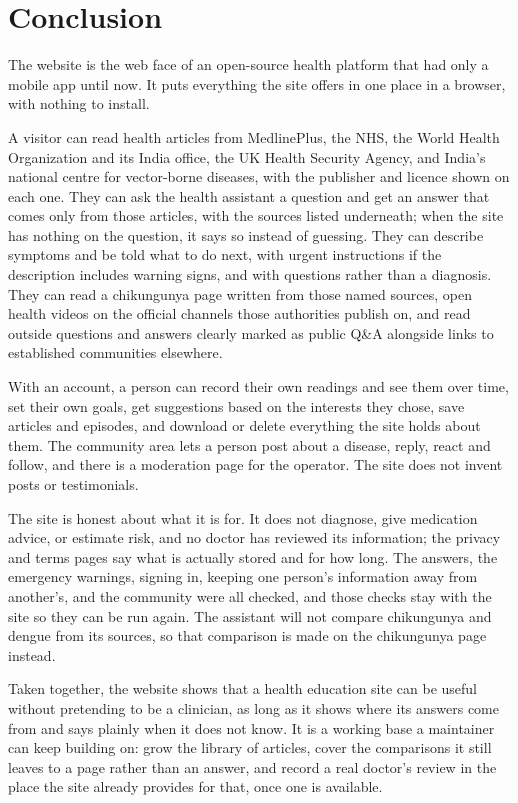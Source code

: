 \chapter{Conclusion}

The website is the web face of an open-source health platform that had only a mobile app until now. It puts everything the site offers in one place in a browser, with nothing to install.

A visitor can read health articles from MedlinePlus, the NHS, the World Health Organization and its India office, the UK Health Security Agency, and India's national centre for vector-borne diseases, with the publisher and licence shown on each one. They can ask the health assistant a question and get an answer that comes only from those articles, with the sources listed underneath; when the site has nothing on the question, it says so instead of guessing. They can describe symptoms and be told what to do next, with urgent instructions if the description includes warning signs, and with questions rather than a diagnosis. They can read a chikungunya page written from those named sources, open health videos on the official channels those authorities publish on, and read outside questions and answers clearly marked as public Q&A alongside links to established communities elsewhere.

With an account, a person can record their own readings and see them over time, set their own goals, get suggestions based on the interests they chose, save articles and episodes, and download or delete everything the site holds about them. The community area lets a person post about a disease, reply, react and follow, and there is a moderation page for the operator. The site does not invent posts or testimonials.

The site is honest about what it is for. It does not diagnose, give medication advice, or estimate risk, and no doctor has reviewed its information; the privacy and terms pages say what is actually stored and for how long. The answers, the emergency warnings, signing in, keeping one person's information away from another's, and the community were all checked, and those checks stay with the site so they can be run again. The assistant will not compare chikungunya and dengue from its sources, so that comparison is made on the chikungunya page instead.

Taken together, the website shows that a health education site can be useful without pretending to be a clinician, as long as it shows where its answers come from and says plainly when it does not know. It is a working base a maintainer can keep building on: grow the library of articles, cover the comparisons it still leaves to a page rather than an answer, and record a real doctor's review in the place the site already provides for that, once one is available.

